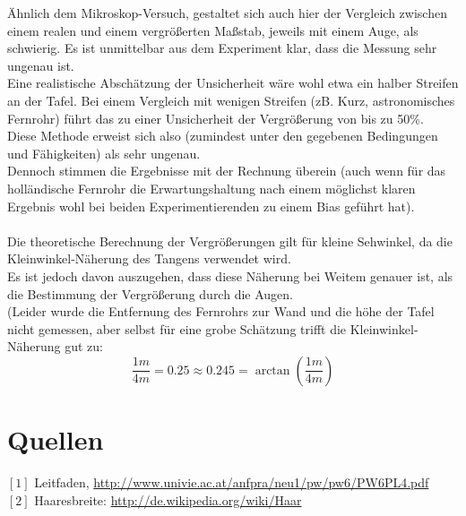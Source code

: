 \documentclass[12pt,a4paper]{article}
\begin{document}
\begin{multicols}{2}
Ähnlich dem Mikroskop-Versuch,  gestaltet sich auch hier der Vergleich zwischen einem realen und einem vergrößerten Maßstab, jeweils mit einem Auge, als schwierig. Es ist unmittelbar aus dem Experiment klar, dass die Messung sehr ungenau ist.\\
Eine realistische Abschätzung der Unsicherheit wäre wohl etwa ein halber Streifen an der Tafel. Bei einem Vergleich mit wenigen Streifen (zB. Kurz, astronomisches Fernrohr) führt das zu einer Unsicherheit der Vergrößerung von bis zu 50\%.\\
Diese Methode erweist sich also (zumindest unter den gegebenen Bedingungen und Fähigkeiten) als sehr ungenau.\\
Dennoch stimmen die Ergebnisse mit der Rechnung überein (auch wenn für das holländische Fernrohr die Erwartungshaltung nach einem möglichst klaren Ergebnis wohl bei beiden Experimentierenden zu einem Bias geführt hat).\\
\\
Die theoretische Berechnung der Vergrößerungen gilt für kleine Sehwinkel, da die Kleinwinkel-Näherung des Tangens verwendet wird.\\
Es ist jedoch davon auszugehen, dass diese Näherung bei Weitem genauer ist, als die Bestimmung der Vergrößerung durch die Augen.\\
(Leider wurde die Entfernung des Fernrohrs zur Wand und die höhe der Tafel nicht gemessen, aber selbst für eine grobe Schätzung trifft die Kleinwinkel-Näherung gut zu:
$$\frac{1m}{4m}=0.25\approx 0.245= \arctan (\frac{1m}{4m})$$

\section{Quellen}
$[1]$ Leitfaden, \url{http://www.univie.ac.at/anfpra/neu1/pw/pw6/PW6PL4.pdf}\\
$[2]$ Haaresbreite: \url{http://de.wikipedia.org/wiki/Haar}

\end{multicols}
\end{document}

